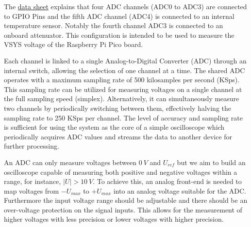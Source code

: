 The \href{https://datasheets.raspberrypi.com/rp2040/rp2040-datasheet.pdf}{data sheet} explains that four ADC channels (ADC0 to ADC3) are connected to GPIO Pins and the fifth ADC channel (ADC4) is connected to an internal temperature sensor. Notably the fourth channel ADC3 is connected to an onboard attenuator. This configuration is intended to be used to measure the VSYS voltage of the Raspberry Pi Pico board.

Each channel is linked to a single Analog-to-Digital Converter (ADC) through an internal switch, allowing the selection of one channel at a time. The shared ADC operates with a maximum sampling rate of 500 kilosamples per second (KSps). This sampling rate can be utilized for measuring voltages on a single channel at the full sampling speed (simplex). Alternatively, it can simultaneously measure two channels by periodically switching between them, effectively halving the sampling rate to 250 KSps per channel. The level of accuracy and sampling rate is sufficient for using the system as the core of a simple oscilloscope which periodically acquires ADC values and streams the data to another device for further processing.

An ADC can only measure voltages between $\SI{0}{V}$ and $U_{ref}$ but we aim to build an oscilloscope capable of measuring both positive and negative voltages within a range, for instance, $\vert U \vert > \SI{10}{V}$. To achieve this, an analog front-end is needed to map voltages from $-U_{max}$ to $+U_{max}$ into an analog voltage suitable for the ADC. Furthermore the input voltage range should be adjustable and there should be an over-voltage protection on the signal inputs. This allows for the measurement of higher voltages with less precision or lower voltages with higher precision.
